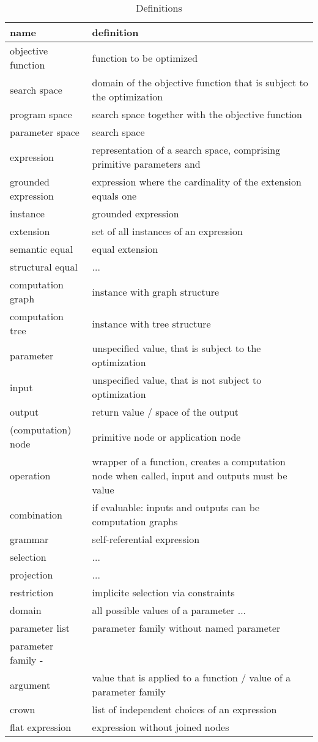 \documentclass[english]{article}
\begin{document}
\begin{table}
  \begin{tabular}{| l | l |}
    \hline
    name & definition \\
    \hline \hline
    objective function & function to be optimized \\
    search space &  domain of the objective function that is subject to the optimization\\
    program space & search space together with the objective function \\
    parameter space & search space \\
    expression & representation of a search space, comprising primitive parameters and \\
    grounded expression & expression where the cardinality of the extension equals one \\
    instance & grounded expression \\
    extension & set of all instances of an expression \\
    semantic equal & equal extension \\
    structural equal & ... \\
    computation graph & instance with graph structure \\
    computation tree & instance with tree structure \\
    parameter & unspecified value, that is subject to the optimization \\
    input & unspecified value, that is not subject to optimization \\
    output & return value / space of the output \\
    (computation) node & primitive node or application node \\
    operation & wrapper of a function, creates a computation node when called, input and outputs must be value \\
    combination & if evaluable: inputs and outputs can be computation graphs \\
    grammar & self-referential expression \\
    selection & ... \\
    projection & ... \\
    restriction & implicite selection via constraints \\
    domain & all possible values of a parameter ... \\
    parameter list & parameter family without named parameter \\
    parameter family - \\
    argument & value that is applied to a function / value of a parameter family \\
    crown & list of independent choices of an expression \\
    flat expression & expression without joined nodes \\
    \hline
  \end{tabular}
  \caption{Definitions}
  \label{definitions}

\end{table}
\end{document}

